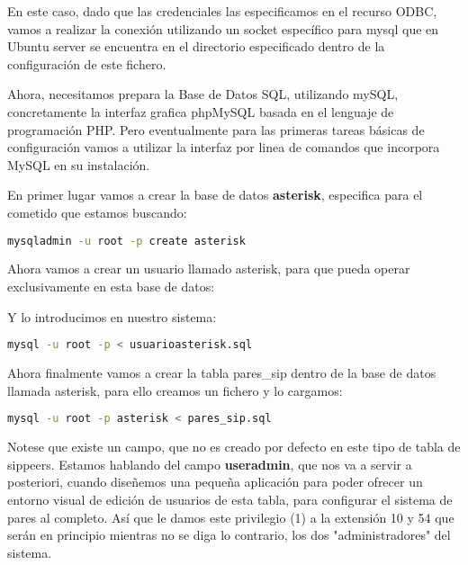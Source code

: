 En este caso, dado que las credenciales las especificamos en el recurso ODBC, vamos a realizar la conexión utilizando un socket específico para mysql que en Ubuntu server se encuentra en el directorio especificado dentro de la configuración de este fichero.

Ahora, necesitamos prepara la Base de Datos SQL, utilizando mySQL, concretamente la interfaz grafica phpMySQL basada en el lenguaje de programación PHP. Pero eventualmente para las primeras tareas básicas de configuración vamos a utilizar la interfaz por linea de comandos que incorpora MySQL en su instalación.

En primer lugar vamos a crear la base de datos \textbf{asterisk}, especifica para el cometido que estamos buscando:

\begin{lstlisting}[language=sh]
mysqladmin -u root -p create asterisk
\end{lstlisting}

Ahora vamos a crear un usuario llamado asterisk, para que pueda operar exclusivamente en esta base de datos:



Y lo introducimos en nuestro sistema:

\begin{lstlisting}[language=sh]
mysql -u root -p < usuarioasterisk.sql
\end{lstlisting}

Ahora finalmente vamos a crear la tabla pares\_sip dentro de la base de datos llamada asterisk, para ello creamos un fichero y lo cargamos:



\begin{lstlisting}[language=sh]
mysql -u root -p asterisk < pares_sip.sql
\end{lstlisting}

Notese que existe un campo, que no es creado por defecto en este tipo de tabla de sippeers. Estamos hablando del campo \textbf{useradmin}, que nos va a servir a posteriori, cuando diseñemos una pequeña aplicación para poder ofrecer un entorno visual de edición de usuarios de esta tabla, para configurar el sistema de pares al completo. Así que le damos este privilegio (1) a la extensión 10 y 54 que serán en principio mientras no se diga lo contrario, los dos "administradores" del sistema.


